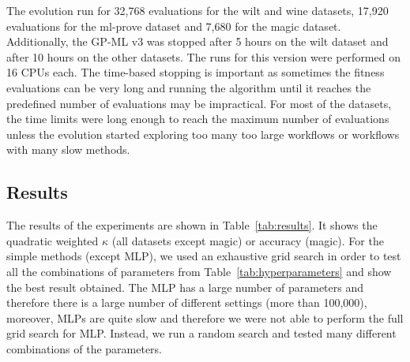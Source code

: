 \documentclass{ws-ijait}
\begin{document}
The evolution run for 32,768 evaluations for the wilt and wine datasets, 17,920
evaluations for the ml-prove dataset and 7,680 for the magic dataset.
Additionally, the GP-ML v3 was stopped after 5 hours on the wilt dataset and
after 10 hours on the other datasets. The runs for this version were performed
on 16 CPUs each. The time-based stopping is important as sometimes the fitness
evaluations can be very long and running the algorithm until it reaches the
predefined number of evaluations may be impractical. For most of the datasets,
the time limits were long enough to reach the maximum number of evaluations
unless the evolution started exploring too many too large workflows or workflows
with many slow methods.

\subsection{Results}

The results of the experiments are shown in Table~\ref{tab:results}. It shows
the quadratic weighted $\kappa$ (all datasets except magic) or accuracy (magic).
For the simple methods (except MLP), we used an exhaustive grid search in order
to test all the combinations of parameters from Table~\ref{tab:hyperparameters}
and show the best result obtained. The MLP has a large number of parameters and
therefore there is a large number of different settings (more than 100,000),
moreover, MLPs are quite slow and therefore we were not able to perform the full
grid search for MLP. Instead, we run a random search and tested many different
combinations of the parameters.
\end{document}
